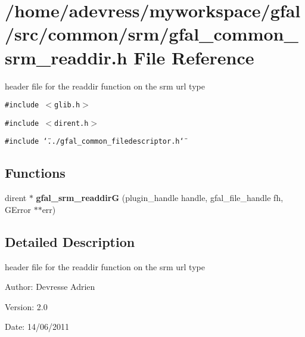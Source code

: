 \section{/home/adevress/myworkspace/gfal/src/common/srm/gfal\_\-common\_\-srm\_\-readdir.h File Reference}
\label{gfal__common__srm__readdir_8h}
header file for the readdir function on the srm url type 

{\tt \#include $<$glib.h$>$}\par
{\tt \#include $<$dirent.h$>$}\par
{\tt \#include \char`\"{}../gfal\_\-common\_\-filedescriptor.h\char`\"{}}\par
\subsection*{Functions}
\begin{CompactItemize}
\item 
dirent $\ast$ \textbf{gfal\_\-srm\_\-readdir\-G} (plugin\_\-handle handle, gfal\_\-file\_\-handle fh, GError $\ast$$\ast$err)\label{gfal__common__srm__readdir_8h_280678cb4f01a57d8785d93b982b1248}

\end{CompactItemize}


\subsection{Detailed Description}
header file for the readdir function on the srm url type 

\begin{Desc}
\item[Author:]Devresse Adrien \end{Desc}
\begin{Desc}
\item[Version:]2.0 \end{Desc}
\begin{Desc}
\item[Date:]14/06/2011 \end{Desc}

